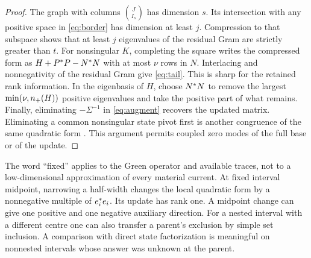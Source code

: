 \begin{proof}
The graph with columns $\binom{J}{I_s}$ has dimension $s$. Its intersection with any positive space in \eqref{eq:border} has dimension at least $j$. Compression to that subspace shows that at least $j$ eigenvalues of the residual Gram are strictly greater than $t$. For nonsingular $K$, completing the square writes the compressed form as $H+P\HH P-N\HH N$ with at most $\nu$ rows in $N$. Interlacing and nonnegativity of the residual Gram give \eqref{eq:tail}. This is sharp for the retained rank information. In the eigenbasis of $H$, choose $N\HH N$ to remove the largest $\min(\nu,\nplus(H))$ positive eigenvalues and take the positive part of what remains. Finally, eliminating $-\Sigma^{-1}$ in \eqref{eq:augment} recovers the updated matrix. Eliminating a common nonsingular state pivot first is another congruence of the same quadratic form \cite{haynsworth,tian,fan}. This argument permits coupled zero modes of the full base or of the update.
\end{proof}

The word ``fixed'' applies to the Green operator and available traces, not to a low-dimensional approximation of every material current. At fixed interval midpoint, narrowing a half-width changes the local quadratic form by a nonnegative multiple of $e_i\HH e_i$. Its update has rank one. A midpoint change can give one positive and one negative auxiliary direction. For a nested interval with a different centre one can also transfer a parent's exclusion by simple set inclusion. A comparison with direct state factorization is meaningful on nonnested intervals whose answer was unknown at the parent.

